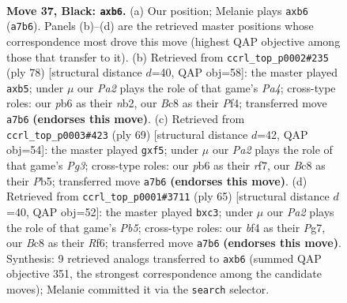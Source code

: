 \documentclass[11pt]{article}
\begin{document}
\clearpage

\begin{figure}[p]\centering
\begin{subfigure}{0.46\textwidth}\centering
\resizebox{\linewidth}{!}{%
\newchessgame
\chessboard[
  setfen={r1bN4/p6k/1PP1p3/P1np4/5B2/2P5/5K2/R7 b - - 0 37},
  showmover=false,
  pgfstyle=straightmove, color=movearrow, markmove={a7-b6}
]}
\caption{}
\end{subfigure}\hfill
\begin{subfigure}{0.46\textwidth}\centering
\resizebox{\linewidth}{!}{%
\newchessgame
\chessboard[
  setfen={5k2/1B3p2/p6p/1pr5/P2R1P2/7P/1n3KP1/8 w - - 0 40},
  showmover=false,
  pgfstyle=straightmove, color=movearrow, markmove={a4-b5}
]}
\caption{}
\end{subfigure}
\\[4pt]
\begin{subfigure}{0.46\textwidth}\centering
\resizebox{\linewidth}{!}{%
\newchessgame
\chessboard[
  setfen={2r5/5R1p/2k2pp1/1p3P2/4n3/BP1N4/2Pb2PP/5K2 b - - 0 35},
  showmover=false,
  pgfstyle=straightmove, color=movearrow, markmove={g6-f5}
]}
\caption{}
\end{subfigure}\hfill
\begin{subfigure}{0.46\textwidth}\centering
\resizebox{\linewidth}{!}{%
\newchessgame
\chessboard[
  setfen={6k1/6p1/4pr2/1BN1n3/1p2P3/2P5/PP5b/1K1R4 b - - 0 33},
  showmover=false,
  pgfstyle=straightmove, color=movearrow, markmove={b4-c3}
]}
\caption{}
\end{subfigure}
\caption{\textbf{Move 37, Black: \texttt{axb6}.} (a) Our position; Melanie plays \texttt{axb6} (\texttt{a7b6}). Panels (b)--(d) are the retrieved master positions whose correspondence most drove this move (highest QAP objective among those that transfer to it). (b) Retrieved from \texttt{ccrl\_top\_p0002\#235} (ply 78) [structural distance $d$=40, QAP obj=58]: the master played \texttt{axb5}; under $\mu$ our \emph{Pa2} plays the role of that game's \emph{Pa4}; cross-type roles: our \emph{p}b6 as their \emph{n}b2, our \emph{B}c8 as their \emph{P}f4; transferred move \texttt{a7b6} \textbf{(endorses this move)}. (c) Retrieved from \texttt{ccrl\_top\_p0003\#423} (ply 69) [structural distance $d$=42, QAP obj=54]: the master played \texttt{gxf5}; under $\mu$ our \emph{Pa2} plays the role of that game's \emph{Pg3}; cross-type roles: our \emph{p}b6 as their \emph{r}f7, our \emph{B}c8 as their \emph{P}b5; transferred move \texttt{a7b6} \textbf{(endorses this move)}. (d) Retrieved from \texttt{ccrl\_top\_p0001\#3711} (ply 65) [structural distance $d$=40, QAP obj=52]: the master played \texttt{bxc3}; under $\mu$ our \emph{Pa2} plays the role of that game's \emph{Pb5}; cross-type roles: our \emph{b}f4 as their \emph{P}g7, our \emph{B}c8 as their \emph{R}f6; transferred move \texttt{a7b6} \textbf{(endorses this move)}. Synthesis: 9 retrieved analogs transferred to \texttt{axb6} (summed QAP objective 351, the strongest correspondence among the candidate moves); Melanie committed it via the \texttt{search} selector.}
\label{fig:thought-m73}
\end{figure}
\end{document}
